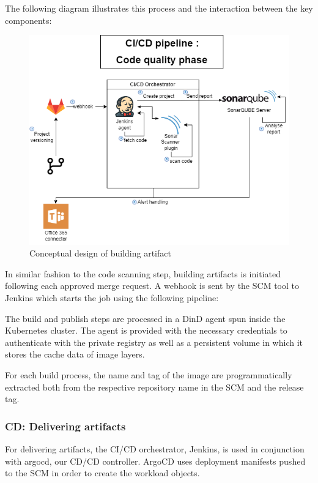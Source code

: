 The following diagram illustrates this process and the interaction between the key components: 

\begin{figure}[H]\centering
\includegraphics[width=1.0\textwidth,angle=00]{assets/f48.png}
\caption{Conceptual design of building artifact }
\label{fig:Conceptual design of building artifact }
\end{figure}

In similar fashion to the code scanning step, building artifacts is initiated following each approved merge request. A webhook is sent by the SCM tool to Jenkins which starts the job using the following pipeline: 

The build and publish steps are processed in a DinD agent spun inside the Kubernetes cluster. The agent is provided with the necessary credentials to authenticate with the private registry as well as a persistent volume in which it stores the cache data of image layers. 

For each build process, the name and tag of the image are programmatically extracted both from the respective repository name in the SCM and the release tag. 

\subsubsection{CD: Delivering artifacts }

For delivering artifacts, the CI/CD orchestrator, Jenkins, is used in conjunction with argocd, our CD/CD controller. ArgoCD uses deployment manifests pushed to the SCM in order to create the workload objects. 

